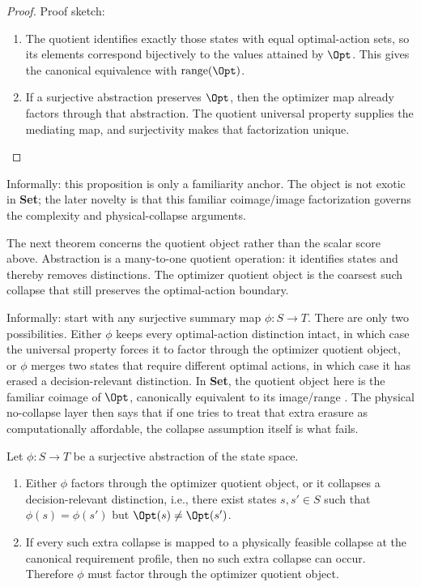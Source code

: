 \begin{proof}
Proof sketch:
\begin{enumerate}
\item The quotient identifies exactly those states with equal optimal-action sets, so its elements correspond bijectively to the values attained by $\Opt$. This gives the canonical equivalence with $\mathrm{range}(\Opt)$.
\item If a surjective abstraction preserves $\Opt$, then the optimizer map already factors through that abstraction. The quotient universal property supplies the mediating map, and surjectivity makes that factorization unique.
\end{enumerate}
\end{proof}

Informally: this proposition is only a familiarity anchor. The object is not exotic in \textbf{Set}; the later novelty is that this familiar coimage/image factorization governs the complexity and physical-collapse arguments.

The next theorem concerns the quotient object rather than the scalar score above. Abstraction is a many-to-one quotient operation: it identifies states and thereby removes distinctions. The optimizer quotient object is the coarsest such collapse that still preserves the optimal-action boundary.

Informally: start with any surjective summary map $\phi : S \to T$. There are only two possibilities. Either $\phi$ keeps every optimal-action distinction intact, in which case the universal property forces it to factor through the optimizer quotient object, or $\phi$ merges two states that require different optimal actions, in which case it has erased a decision-relevant distinction. In \textbf{Set}, the quotient object here is the familiar coimage of $\Opt$, canonically equivalent to its image/range \cite{maclane1998categories}. The physical no-collapse layer then says that if one tries to treat that extra erasure as computationally affordable, the collapse assumption itself is what fails.

\begin{theorem}\label{thm:abstraction-boundary}
Let $\phi : S \to T$ be a surjective abstraction of the state space.

\begin{enumerate}
\item Either $\phi$ factors through the optimizer quotient object, or it collapses a decision-relevant distinction, i.e., there exist states $s,s' \in S$ such that $\phi(s)=\phi(s')$ but $\Opt(s)\neq\Opt(s')$.
\item If every such extra collapse is mapped to a physically feasible collapse at the canonical requirement profile, then no such extra collapse can occur. Therefore $\phi$ must factor through the optimizer quotient object.
\end{enumerate}
\end{theorem}

